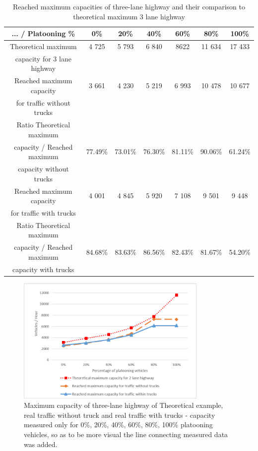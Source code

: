 \begin{table}[ph]
\begin{centering}
\begin{tabular}{|c|c|c|c|c|c|c|}
\hline 
 ... / Platooning \% &	0\% &	20\% &	40\% &	60\% &	80\% &	100\%\tabularnewline
\hline 
Theoretical maximum &	4 725 &	5 793 &	6 840 &	8622 &	11 634 &	17 433
\tabularnewline
 capacity for 3 lane highway & & & & & &\tabularnewline
\hline 
Reached maximum capacity & 3 661 &	4 230 &	5 219 &	6 993 &	10 478 &	10 677
\tabularnewline
for traffic without trucks & & & & & &\tabularnewline
\hline 
Ratio Theoretical maximum & & & & & &\tabularnewline
capacity / Reached maximum & 77.49\% &	73.01\% &	76.30\% &	81.11\% &	90.06\% &	61.24\%\tabularnewline
capacity without trucks & & & & & &\tabularnewline
\hline 
Reached maximum capacity & 4 001 &	4 845 &	5 920 &	7 108 &	9 501 &	9 448\tabularnewline
for traffic with trucks & & & & & &\tabularnewline
\hline 
Ratio Theoretical maximum & & & & & &\tabularnewline
capacity / Reached maximum & 84.68\% &	83.63\% &	86.56\% &	82.43\% &	81.67\% &	54.20\%\tabularnewline
capacity with trucks & & & & & &\tabularnewline
\hline 
\end{tabular}
\centering
\protect\caption{\label{tab:5_4-1}Reached maximum capacities of three-lane highway and their comparison to theoretical maximum 3 lane highway}
\end{centering}
\end{table}

\begin{figure}[ph]
\centering
\includegraphics[width=0.82\textwidth,height=0.82\textheight,keepaspectratio]{figures/Chapter_5/5_2lane_maxCap.png}
\centering
\protect\caption[Maximum capacity of three-lane highway of Theoretical example, real traffic without truck and real traffic with trucks]{\label{fig:5_4-3}Maximum capacity of three-lane highway of Theoretical example, real traffic without truck and real traffic with trucks - capacity measured only for 0\%, 20\%, 40\%, 60\%, 80\%, 100\% platooning vehicles, so as to be more visual the line connecting measured data was added.}
\end{figure}

